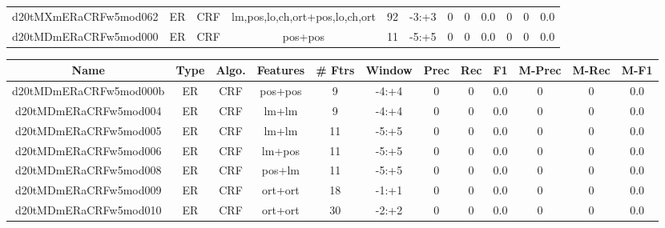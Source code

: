 \documentclass[a4paper]{article}
\begin{document}
\begin{landscape}
\begin{center}
\begin{tabular}{ |c|c|c|c|c|c|c|c|c|c|c|c|}
 
 	
 	\small{ d20tMXmERaCRFw5mod062 } & ER & CRF & lm,pos,lo,ch,ort+pos,lo,ch,ort  &  92 &  -3:+3  &  0 & 0 & 0.0  &  0 & 0 & 0.0 \\
 	

 
 	
 	\small{ d20tMDmERaCRFw5mod000 } & ER & CRF & pos+pos  &  11 &  -5:+5  &  0 & 0 & 0.0  &  0 & 0 & 0.0 \\
 	
 \hline
\end{tabular}
\end{center}




\begin{center}
\begin{tabular}{ |c|c|c|c|c|c|c|c|c|c|c|c|} 
 \hline
 	Name & Type & Algo. & Features & \# Ftrs & Window & Prec & Rec & F1 & M-Prec & M-Rec & M-F1\\
 \hline

 	

 
 	
 	\small{ d20tMDmERaCRFw5mod000b } & ER & CRF & pos+pos  &  9 &  -4:+4  &  0 & 0 & 0.0  &  0 & 0 & 0.0 \\
 	

 
 	
 	\small{ d20tMDmERaCRFw5mod004 } & ER & CRF & lm+lm  &  9 &  -4:+4  &  0 & 0 & 0.0  &  0 & 0 & 0.0 \\
 	

 
 	
 	\small{ d20tMDmERaCRFw5mod005 } & ER & CRF & lm+lm  &  11 &  -5:+5  &  0 & 0 & 0.0  &  0 & 0 & 0.0 \\
 	

 
 	
 	\small{ d20tMDmERaCRFw5mod006 } & ER & CRF & lm+pos  &  11 &  -5:+5  &  0 & 0 & 0.0  &  0 & 0 & 0.0 \\
 	

 
 	
 	\small{ d20tMDmERaCRFw5mod008 } & ER & CRF & pos+lm  &  11 &  -5:+5  &  0 & 0 & 0.0  &  0 & 0 & 0.0 \\
 	

 
 	
 	\small{ d20tMDmERaCRFw5mod009 } & ER & CRF & ort+ort  &  18 &  -1:+1  &  0 & 0 & 0.0  &  0 & 0 & 0.0 \\
 	

 
 	
 	\small{ d20tMDmERaCRFw5mod010 } & ER & CRF & ort+ort  &  30 &  -2:+2  &  0 & 0 & 0.0  &  0 & 0 & 0.0 \\
 	


\end{tabular}
\end{center}
\end{landscape}
\end{document}

